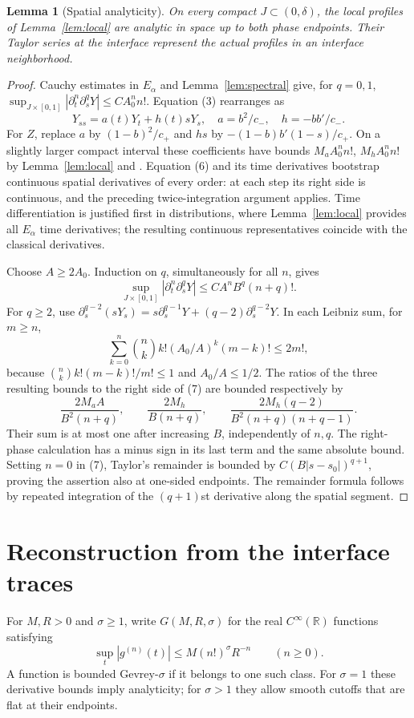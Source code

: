 \documentclass[11pt]{article}
\newtheorem{lemma}[theorem]{Lemma}
\begin{document}
\begin{lemma}[Spatial analyticity]\label{lem:spatial}
On every compact $J\subset(0,\delta)$, the local profiles of Lemma~\ref{lem:local}
are analytic in space up to both phase endpoints. Their Taylor series
at the interface represent the actual profiles in an interface
neighborhood.
\end{lemma}
\begin{proof}
Cauchy estimates in $E_\alpha$ and Lemma~\ref{lem:spectral} give, for $q=0,1$,
$\sup_{J\times[0,1]}|\partial_t^n\partial_s^qY|\le C A_0^n n!$.
Equation (3) rearranges as
\[
 Y_{ss}=a(t)Y_t+h(t)sY_s,
 \quad a=b^2/c_-,\quad h=-bb'/c_-. \tag{6}
\]
For $Z$, replace $a$ by $(1-b)^2/c_+$ and $h s$ by
$-(1-b)b'(1-s)/c_+$. On a slightly larger compact interval these
coefficients have bounds $M_aA_0^n n!$, $M_hA_0^n n!$ by Lemma~\ref{lem:local} and \cite[Theorem 3.3.8]{CA}.
Equation (6) and its time derivatives bootstrap continuous spatial
derivatives of every order: at each step its right side is continuous,
and the preceding twice-integration argument applies. Time
differentiation is justified first in distributions, where Lemma~\ref{lem:local} provides
all $E_\alpha$ time derivatives; the resulting continuous
representatives coincide with the classical derivatives.

Choose $A\ge2A_0$. Induction on $q$, simultaneously for all $n$,
gives
\[
 \sup_{J\times[0,1]}|\partial_t^n\partial_s^qY|
 \le C A^n B^q(n+q)! . \tag{7}
\]
For $q\ge2$, use
$\partial_s^{q-2}(sY_s)=s\partial_s^{q-1}Y+(q-2)\partial_s^{q-2}Y$.
In each Leibniz sum, for $m\ge n$,
\[
 \sum_{k=0}^n\binom nk k! (A_0/A)^k(m-k)!
 \le 2m!,
\]
because $\binom nk k!(m-k)!/m!\le1$ and $A_0/A\le1/2$.
The ratios of the three resulting bounds to the right side of (7)
are bounded respectively by
\[
 \frac{2M_aA}{B^2(n+q)},\qquad
 \frac{2M_h}{B(n+q)},\qquad
 \frac{2M_h(q-2)}{B^2(n+q)(n+q-1)}.
\]
Their sum is at most one after increasing $B$, independently of $n,q$.
The right-phase calculation has a minus sign in its last term and
the same absolute bound. Setting $n=0$ in (7), Taylor's remainder
is bounded by $C(B|s-s_0|)^{q+1}$, proving the assertion also at
one-sided endpoints. The remainder formula follows by repeated
integration of the $(q+1)$st derivative along the spatial segment.
\end{proof}

\section{Reconstruction from the interface traces}
For $M,R>0$ and $\sigma\ge1$, write $G(M,R,\sigma)$ for the real
$C^\infty(\mathbb R)$ functions satisfying
\[\sup_t|g^{(n)}(t)|\le M(n!)^\sigma R^{-n}\qquad(n\ge0).\]
A function is bounded Gevrey-$\sigma$ if it belongs to one such class.
For $\sigma=1$ these derivative bounds imply analyticity; for
$\sigma>1$ they allow smooth cutoffs that are flat at their endpoints.
\end{document}
